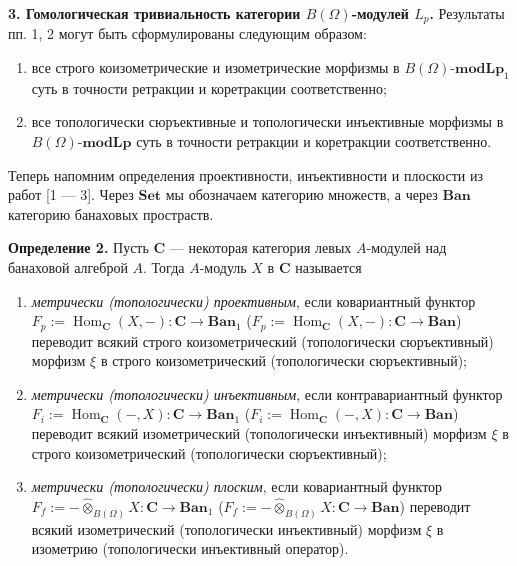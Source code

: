 \documentclass[11pt,twoside]{article}
\begin{document}
\textbf{3. Гомологическая тривиальность категории $B(\Omega)$-модулей $L_p$.}
Результаты пп. 1, 2 могут быть сформулированы следующим образом:
\begin{enumerate}[label = (\roman*)]
    \item все строго коизометрические и изометрические морфизмы в
            $B(\Omega)$-$\mathbf{modLp}_1$ суть в точности ретракции и
            коретракции соответственно;

    \item все топологически сюръективные и топологически инъективные
            морфизмы в $B(\Omega)$-$\mathbf{modLp}$ суть в точности
            ретракции и коретракции соответственно.
\end{enumerate}
Теперь напомним определения проективности, инъективности и плоскости из
работ [1 --- 3]. Через $\mathbf{Set}$ мы обозначаем категорию множеств,
а через $\mathbf{Ban}$ категорию банаховых простраств.

\textbf{Определение 2.} Пусть $\mathbf{C}$ --- некоторая категория левых
$A$-модулей над банаховой алгеброй $A$. Тогда $A$-модуль $X$ в $\mathbf{C}$
называется
\begin{enumerate}[label = (\roman*)]
    \item \textit{метрически (топологически) проективным}, если
            ковариантный функтор
            $F_p:=\operatorname{Hom}_{\mathbf{C}}(X,-):
                \mathbf{C}\to\mathbf{Ban}_1$
            ($F_p:=\operatorname{Hom}_{\mathbf{C}}(X,-):
                \mathbf{C}\to\mathbf{Ban}$)
            переводит всякий строго коизометрический (топологически
            сюръективный) морфизм $\xi$ в строго коизометрический
            (топологически сюръективный);

    \item \textit{метрически (топологически) инъективным}, если
            контравариантный функтор
            $F_i:=\operatorname{Hom}_{\mathbf{C}}(-,X):
                \mathbf{C}\to\mathbf{Ban}_1$
            ($F_i:=\operatorname{Hom}_{\mathbf{C}}(-,X):
                \mathbf{C}\to\mathbf{Ban}$)
            переводит всякий изометрический (топологически инъективный)
            морфизм $\xi$ в строго коизометрический (топологически
            сюръективный);

    \item \textit{метрически (топологически) плоским}, если ковариантный
            функтор
            $F_f:=-\widehat{\otimes}_{B(\Omega)}X:
                \mathbf{C}\to\mathbf{Ban}_1$
            ($F_f:=-\widehat{\otimes}_{B(\Omega)}X:
                \mathbf{C}\to\mathbf{Ban}$)
            переводит всякий изометрический (топологически инъективный)
            морфизм $\xi$ в изометрию (топологически инъективный
            оператор).
\end{enumerate}
\end{document}
